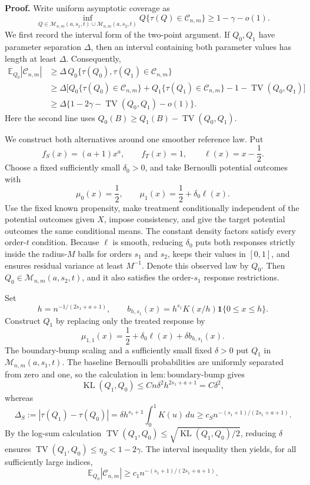 \textbf{Proof.}
Write uniform asymptotic coverage as
\[
 \inf_{Q\in\mathcal M_{n,m}(a,s_1,t)\cup
                   \mathcal M_{n,m}(a,s_2,t)}
 Q\{\tau(Q)\in\mathcal C_{n,m}\}
 \ge1-\gamma-o(1).
\]
We first record the interval form of the two-point argument.  If \(Q_0,Q_1\) have parameter separation \(\Delta\), then an interval containing both parameter values has length at least \(\Delta\).  Consequently,
\[
\begin{aligned}
 \mathbb E_{Q_0}|\mathcal C_{n,m}|
 &\ge \Delta\,Q_0\{\tau(Q_0),\tau(Q_1)\in\mathcal C_{n,m}\}\\
 &\ge \Delta\bigl[Q_0\{\tau(Q_0)\in\mathcal C_{n,m}\}
       +Q_1\{\tau(Q_1)\in\mathcal C_{n,m}\}
       -1-\operatorname{TV}(Q_0,Q_1)\bigr]\\
 &\ge \Delta\{1-2\gamma-\operatorname{TV}(Q_0,Q_1)-o(1)\}.
\end{aligned}
\]
Here the second line uses
\(Q_0(B)\ge Q_1(B)-\operatorname{TV}(Q_0,Q_1)\).

We construct both alternatives around one smoother reference law.  Put
\[
 f_S(x)=(a+1)x^a,\qquad f_T(x)=1,
 \qquad \ell(x)=x-\frac12.
\]
Choose a fixed sufficiently small \(\delta_0>0\), and take Bernoulli potential outcomes with
\[
 \mu_0(x)=\frac12,
 \qquad
 \mu_1(x)=\frac12+\delta_0\ell(x).
\]
Use the fixed known propensity, make treatment conditionally independent of the potential outcomes given \(X\), impose consistency, and give the target potential outcomes the same conditional means.  The constant density factors satisfy every order-\(t\) condition.  Because \(\ell\) is smooth, reducing \(\delta_0\) puts both responses strictly inside the radius-\(M\) balls for orders \(s_1\) and \(s_2\), keeps their values in \([0,1]\), and ensures residual variance at least \(M^{-1}\).  Denote this observed law by \(Q_0\).  Then
\(Q_0\in\mathcal M_{n,m}(a,s_2,t)\), and it also satisfies the order-\(s_1\) response restrictions.

Set
\[
 h=n^{-1/(2s_1+a+1)},
 \qquad
 b_{h,s_1}(x)=h^{s_1}K(x/h)\mathbf 1\{0\le x\le h\}.
\]
Construct \(Q_1\) by replacing only the treated response by
\[
 \mu_{1,1}(x)=\frac12+\delta_0\ell(x)+\delta b_{h,s_1}(x).
\]
The boundary-bump scaling and a sufficiently small fixed \(\delta>0\) put
\(Q_1\) in \(\mathcal M_{n,m}(a,s_1,t)\).  The baseline Bernoulli probabilities are uniformly separated from zero and one, so the calculation in
\(\mathrm{lem:boundary\text{-}bump}\) gives
\[
 \operatorname{KL}(Q_1,Q_0)
 \le Cn\delta^2h^{2s_1+a+1}
 =C\delta^2,
\]
whereas
\[
 \Delta_S:=|\tau(Q_1)-\tau(Q_0)|
 =\delta h^{s_1+1}\int_0^1K(u)\,du
 \ge c_Sn^{-(s_1+1)/(2s_1+a+1)}.
\]
By the log-sum calculation
\(\operatorname{TV}(Q_1,Q_0)\le
\sqrt{\operatorname{KL}(Q_1,Q_0)/2}\), reducing \(\delta\) ensures
\(\operatorname{TV}(Q_1,Q_0)\le\eta_S<1-2\gamma\).  The interval inequality then yields, for all sufficiently large indices,
\[
 \mathbb E_{Q_0}|\mathcal C_{n,m}|
 \ge c_1n^{-(s_1+1)/(2s_1+a+1)}.
\]


